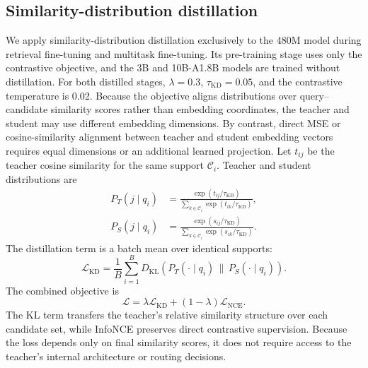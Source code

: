 \documentclass[11pt]{article}
\begin{document}
\subsection{Similarity-distribution distillation}
\label{sec:distill}

We apply similarity-distribution distillation exclusively to the 480M model during retrieval fine-tuning and multitask fine-tuning.
Its pre-training stage uses only the contrastive objective, and the 3B and 10B-A1.8B models are trained without distillation.
For both distilled stages, $\lambda=0.3$, $\tau_{\mathrm{KD}}=0.05$, and the contrastive temperature is 0.02.
Because the objective aligns distributions over query--candidate similarity scores rather than embedding coordinates, the teacher and student may use different embedding dimensions.
By contrast, direct MSE or cosine-similarity alignment between teacher and student embedding vectors requires equal dimensions or an additional learned projection.
Let $t_{ij}$ be the teacher cosine similarity for the same support $\mathcal{C}_i$.
Teacher and student distributions are
\begin{align}
P_T(j\mid q_i) &= \frac{\exp(t_{ij}/\tau_{\mathrm{KD}})}
 {\sum_{k\in\mathcal{C}_i}\exp(t_{ik}/\tau_{\mathrm{KD}})}, \\
P_S(j\mid q_i) &= \frac{\exp(s_{ij}/\tau_{\mathrm{KD}})}
 {\sum_{k\in\mathcal{C}_i}\exp(s_{ik}/\tau_{\mathrm{KD}})}.
\end{align}
The distillation term is a batch mean over identical supports:
\begin{equation}
  \mathcal{L}_{\mathrm{KD}} = \frac{1}{B}\sum_{i=1}^{B}
  D_{\mathrm{KL}}\!\left(P_T(\cdot\mid q_i)\,\|\,P_S(\cdot\mid q_i)\right).
  \label{eq:kd}
\end{equation}
The combined objective is
\begin{equation}
  \mathcal{L}=\lambda\mathcal{L}_{\mathrm{KD}}
  +(1-\lambda)\mathcal{L}_{\mathrm{NCE}}.
  \label{eq:combined}
\end{equation}
The KL term transfers the teacher's relative similarity structure over each candidate set, while InfoNCE preserves direct contrastive supervision.
Because the loss depends only on final similarity scores, it does not require access to the teacher's internal architecture or routing decisions.
\end{document}
